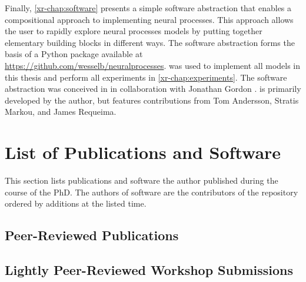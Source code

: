 \documentclass[12pt, twoside]{report}
\newcommand{\xrprefix}[1]{xr-#1}
\begin{document}
Finally, \cref{\xrprefix{chap:software}} presents a simple software abstraction that enables a compositional approach to implementing neural processes.
This approach allows the user to rapidly explore neural processes models by putting together elementary building blocks in different ways.
The software abstraction forms the basis of a Python package  \parencite{Bruinsma:NeuralProcesses} available at \url{https://github.com/wesselb/neuralprocesses}.
 was used to implement all models in this thesis and perform all experiments in \cref{\xrprefix{chap:experiments}}.
The software abstraction was conceived in  in collaboration with Jonathan Gordon \parencite{Bruinsma:NeuralProcesses_jl}.
 is primarily developed by the author, but features contributions from Tom Andersson, Stratis Markou, and James Requeima.

\section{List of Publications and Software}
\label{sec:introduction:publications}

This section lists publications and software the author published during the course of the PhD.
The authors of software are the contributors of the repository ordered by additions at the listed time.

\subsection*{Peer-Reviewed Publications}









\subsection*{Lightly Peer-Reviewed Workshop Submissions}
\end{document}
